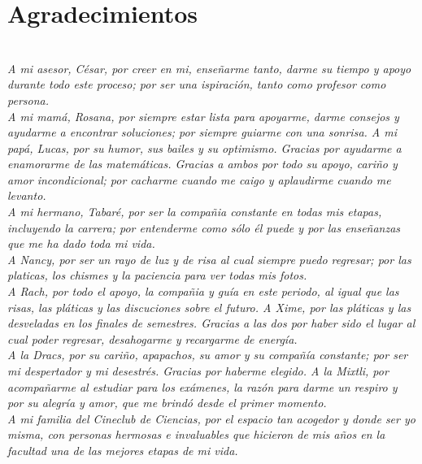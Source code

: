 \chapter*{Agradecimientos}

\textit{}\\

\textit{A mi asesor, C\'esar, por creer en mi, ense\~{n}arme tanto, darme su
tiempo y apoyo durante todo este proceso; por ser una ispiraci\'on, tanto como
profesor como persona.}\\

\textit{A mi mam\'a, Rosana, por siempre estar lista para apoyarme, darme
consejos y ayudarme a encontrar soluciones;  por siempre guiarme con una
sonrisa. A mi pap\'a, Lucas,  por su humor, sus bailes y su optimismo. Gracias
por ayudarme a enamorarme de las matem\'aticas. Gracias a ambos por todo su
apoyo, cari\~{n}o y amor incondicional; por cacharme cuando me caigo y
aplaudirme cuando me levanto.}\\

\textit{A mi hermano, Tabar\'e, por ser la compa\~{n}ia constante en todas mis
etapas, incluyendo la carrera; por entenderme como s\'olo \'el puede y por las
ense\~{n}anzas que me ha dado toda mi vida.}\\

\textit{A Nancy, por ser un rayo de luz y de risa al cual siempre puedo
regresar; por las platicas, los chismes y la paciencia para ver todas mis
fotos.}\\

\textit{A Rach, por todo el apoyo, la compa\~{n}ia y gu\'ia en este periodo, al
igual que las risas, las pl\'aticas y las discuciones sobre el futuro. A Xime,
por las pl\'aticas y las desveladas en los finales de semestres. Gracias a las
dos por haber sido el lugar al cual poder regresar, desahogarme y recargarme de
energ\'ia.} \\

\textit{A la Dracs, por su cari\~{n}o, apapachos, su amor y su compa\~{n}\'ia
constante; por ser mi despertador y mi desestr\'es. Gracias por haberme
elegido. A la Mixtli, por acompa\~{n}arme al estudiar para los ex\'amenes, la
raz\'on para darme un respiro y por su alegr\'ia y amor, que me brind\'o desde
el primer momento.}\\ 

\textit{A mi familia del Cineclub de Ciencias, por el espacio tan acogedor  y
donde ser yo misma, con personas hermosas e invaluables que hicieron de mis
a\~{n}os en la facultad una de las mejores etapas de mi vida.}\\

